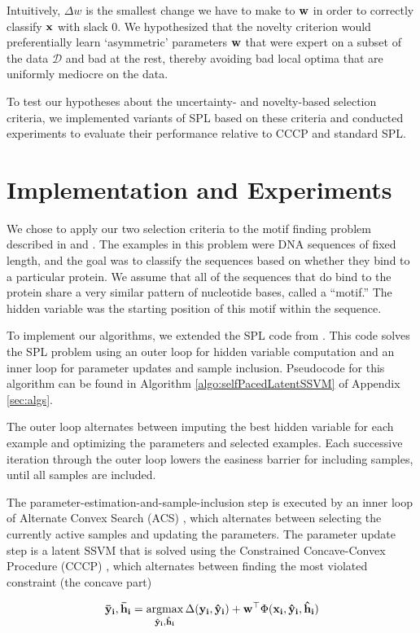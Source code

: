 \documentclass{article}
\newcommand{\mysection}[1]{\vspace{-4mm}\section{#1}\vspace{-4mm}}
\newcommand{\argmax}{\operatornamewithlimits{argmax}}
\begin{document}
Intuitively, $\Delta w$ is the smallest change we have to make to $\bf w$ in order to correctly classify $\bf x$ with slack 0.  We hypothesized that the novelty criterion would preferentially learn `asymmetric' parameters $\bf w$ that were expert on a subset of the data $\mathcal{D}$ and bad at the rest, thereby avoiding bad local optima that are uniformly mediocre on the data.

To test our hypotheses about the uncertainty- and novelty-based selection criteria, we implemented variants of SPL based on these criteria and conducted experiments to evaluate their performance relative to CCCP and standard SPL.

\mysection{Implementation and Experiments}
\label{sec:implementation}

We chose to apply our two selection criteria to the motif finding problem described in \cite{SPL} and \cite{SSVM}. The examples in this problem were DNA sequences of fixed length, and the goal was to classify the sequences based on whether they bind to a particular protein. We assume that all of the sequences that do bind to the protein share a very similar pattern of nucleotide bases, called a ``motif.'' The hidden variable was the starting position of this motif within the sequence.

To implement our algorithms, we extended the SPL code from \cite{SPL}. This code solves the SPL problem using an outer loop for hidden variable computation and an inner loop for parameter updates and sample inclusion. Pseudocode for this algorithm can be found in Algorithm \ref{algo:selfPacedLatentSSVM} of Appendix \ref{sec:algs}.

The outer loop alternates between imputing the best hidden variable for each example and optimizing the parameters and selected examples.  Each successive iteration through the outer loop lowers the easiness barrier for including samples, until all samples are included.

The parameter-estimation-and-sample-inclusion step is executed by an inner loop of Alternate Convex Search ({\sc ACS}) \cite{SPL}, which alternates between selecting the currently active samples and updating the parameters.  The parameter update step is a latent SSVM that is solved using the Constrained Concave-Convex Procedure ({\sc CCCP}) \cite{SSVM}, which alternates between finding the most violated constraint (the concave part)

\begin{equation}
{\bf\bar y_i,\bf\bar h_i} = \argmax_{{\bf\hat y_i},{\bf\hat h_i}} \Delta({\bf y_i,\bf\hat y_i})+{\bf w}^\top\Phi(\bf x_i,\bf\hat y_i,\bf\hat h_i)
\label{eq:mostviolated}
\end{equation}
\end{document}
